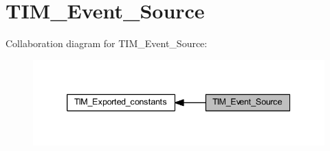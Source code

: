 \hypertarget{group___t_i_m___event___source}{}\section{T\+I\+M\+\_\+\+Event\+\_\+\+Source}
\label{group___t_i_m___event___source}
Collaboration diagram for T\+I\+M\+\_\+\+Event\+\_\+\+Source\+:\nopagebreak
\begin{figure}[H]
\begin{center}
\leavevmode
\includegraphics[width=339pt]{group___t_i_m___event___source}
\end{center}
\end{figure}
